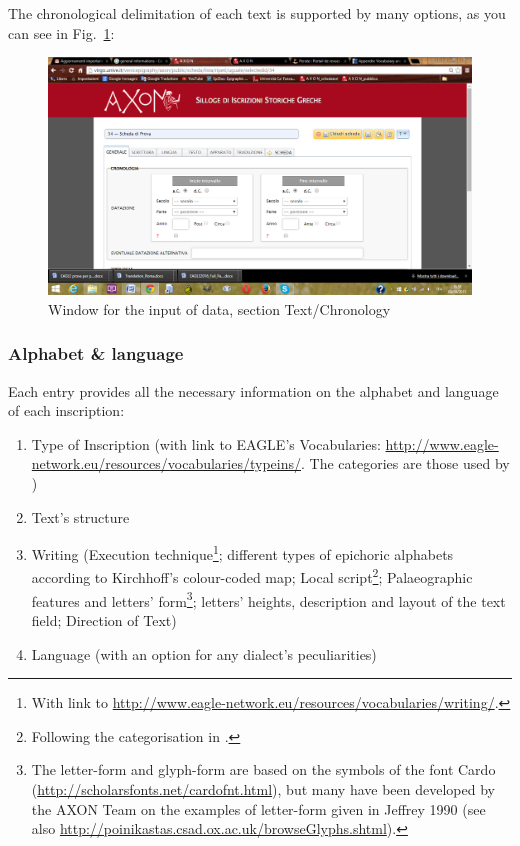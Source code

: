 \documentclass[amsthm,ebook]{saparticle}
\begin{document}
The chronological delimitation of each text is supported by many options, as you can see in Fig.~\ref{fig:1}:

\begin{figure}[!bp]
\centering
 \includegraphics[width=\columnwidth]{EAGLE2016FullPaperrevised-img001.png}
\caption{Window for the input of data, section Text/Chronology}
\label{fig:1}
\end{figure}




\subsubsection{Alphabet \& language}





Each entry provides all the necessary information on the alphabet and language of each inscription:

\begin{enumerate}
\item Type of Inscription (with link to EAGLE’s Vocabularies:
\url{http://www.eagle-network.eu/resources/vocabularies/typeins/}. The categories are those used by \citet{guarducci_epigrafia_1987})
\item Text’s structure
\item Writing (Execution technique\footnote{ With link to \url{http://www.eagle-network.eu/resources/vocabularies/writing/}.};
different types of epichoric alphabets according to Kirchhoff’s colour-coded map; Local script\footnote{ Following the
categorisation in \citet{jeffery_local_1990}.}; Palaeographic features and letters’ form\footnote{ The letter-form and glyph-form are
based on the symbols of the font Cardo (\url{http://scholarsfonts.net/cardofnt.html}), but many have been developed by the
AXON Team on the examples of letter-form given in Jeffrey 1990 (see also
\url{http://poinikastas.csad.ox.ac.uk/browseGlyphs.shtml}).}; letters’ heights, description and layout of the text field;
Direction of Text)
\item Language (with an option for any dialect’s peculiarities)
\end{enumerate}
\end{document}
